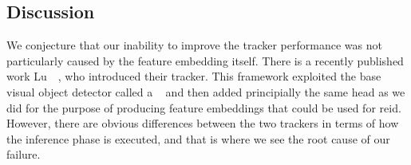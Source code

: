 \subsection{Discussion}

We conjecture that our inability to improve the tracker performance was not particularly caused by the feature embedding itself. There is a recently published work Lu~\etal{}~\cite{lu2020retinatrack}, who introduced their \retinatrack{} tracker. This framework exploited the base visual object detector called a \retinanet{}~\cite{lin2018focal} and then added principially the same head as we did for the purpose of producing feature embeddings that could be used for \gls{reid}. However, there are obvious differences between the two trackers in terms of how the inference phase is executed, and that is where we see the root cause of our failure.
